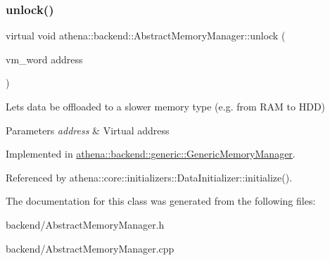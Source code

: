 \subsubsection{\texorpdfstring{unlock()}{unlock()}}
{\footnotesize\ttfamily virtual void athena\+::backend\+::\+Abstract\+Memory\+Manager\+::unlock (\begin{DoxyParamCaption}\item[{vm\+\_\+word}]{address }\end{DoxyParamCaption})\hspace{0.3cm}{\ttfamily [pure virtual]}}

Lets data be offloaded to a slower memory type (e.\+g. from R\+AM to H\+DD) 
\begin{DoxyParams}{Parameters}
{\em address} & Virtual address \\
\hline
\end{DoxyParams}


Implemented in \mbox{\hyperlink{classathena_1_1backend_1_1generic_1_1_generic_memory_manager_a58a2b56a07a96c3cabb7b8fd079b3eae}{athena\+::backend\+::generic\+::\+Generic\+Memory\+Manager}}.



Referenced by athena\+::core\+::initializers\+::\+Data\+Initializer\+::initialize().



The documentation for this class was generated from the following files\+:\begin{DoxyCompactItemize}
\item 
backend/Abstract\+Memory\+Manager.\+h\item 
backend/Abstract\+Memory\+Manager.\+cpp\end{DoxyCompactItemize}

